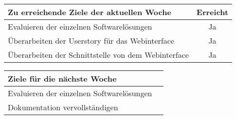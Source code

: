 \begin{tabularx}{\textwidth}{Xc}
    \arrayrulecolor{OliveGreen}
    \toprule
    {\bfseries Zu erreichende Ziele der aktuellen Woche} & {\bfseries Erreicht} \\
    \midrule[2pt]
    Evaluieren der einzelnen Softwarelösungen              &Ja               \\
    \rowcolor{OliveGreen!15}
    Überarbeiten der Userstory für das Webinterface        &Ja               \\
    \rowcolor{White}
    Überarbeiten der Schnittstelle von dem Webinterface    &Ja               \\
    \bottomrule[2pt]
\end{tabularx}
%
\vspace{1cm}
%
\begin{tabularx}{\textwidth}{Xc}
    \arrayrulecolor{OliveGreen}
    \toprule
    {\bfseries Ziele für die nächste Woche}        &                         \\
    \midrule[2pt]
    Evaluieren der einzelnen Softwarelösungen      &                         \\
    \rowcolor{OliveGreen!15}
    Dokumentation vervollständigen                 &                         \\
\end{tabularx}
